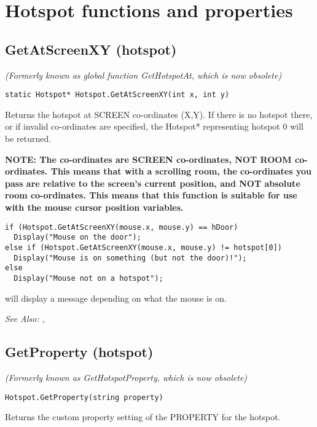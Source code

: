 \section{Hotspot functions and properties}%


\subsection{GetAtScreenXY (hotspot)}\label{Hotspot.GetAtScreenXY}%

\it{(Formerly known as global function GetHotspotAt, which is now obsolete)}

\begin{verbatim}
static Hotspot* Hotspot.GetAtScreenXY(int x, int y)
\end{verbatim}
Returns the hotspot at SCREEN co-ordinates (X,Y).
If there is no hotspot there, or if invalid co-ordinates are specified,
the Hotspot* representing hotspot 0 will be returned.

\bf{NOTE:} The co-ordinates are SCREEN co-ordinates, NOT ROOM co-ordinates. This
means that with a scrolling room, the co-ordinates you pass are relative to
the screen's current position, and NOT absolute room co-ordinates. This
means that this function is suitable for use with the mouse cursor position
variables.

\begin{verbatim}
if (Hotspot.GetAtScreenXY(mouse.x, mouse.y) == hDoor)
  Display("Mouse on the door");
else if (Hotspot.GetAtScreenXY(mouse.x, mouse.y) != hotspot[0])
  Display("Mouse is on something (but not the door)!");
else
  Display("Mouse not on a hotspot");
\end{verbatim}
will display a message depending on what the mouse is on.

\it{See Also:} , 


\subsection{GetProperty (hotspot)}\label{Hotspot.GetProperty}%

\it{(Formerly known as GetHotspotProperty, which is now obsolete)}

\begin{verbatim}
Hotspot.GetProperty(string property)
\end{verbatim}
Returns the custom property setting of the PROPERTY for the hotspot.

